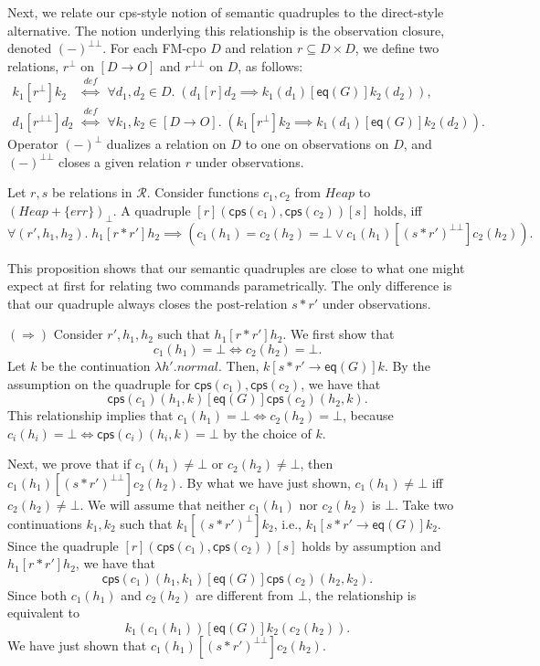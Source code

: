 \documentclass{LMCS}
\newcommand{\Heap}{\mathit{Heap}}
\newcommand{\Obs}{\mathit{O}}
\newcommand{\Good}{\mathit{G}}
\newcommand{\cR}{\mathcal{R}}
\newcommand{\normal}{\mathit{normal}}
\newcommand{\error}{\mathit{err}}
\newcommand{\mperp}{{\bot{\!\!}\bot}}
\newcommand{\squad}[4]{{[{#1}]}
                        ({#2},  {#3})
                       {[{#4}]}}
\newcommand{\EQ}{\mathsf{eq}}
\newcommand{\defliff}{\stackrel{\mathit{def}}{\iff}}
\newcommand{\cps}{\mathsf{cps}}
\begin{document}
Next, we relate our cps-style notion of semantic quadruples 
to the direct-style alternative. The notion underlying 
this relationship is the observation closure, denoted $(-)^\mperp$.
For each FM-cpo $D$ and relation 
$r \subseteq D \times D$, we define two relations, 
$r^\bot$ on $[D \rightarrow \Obs]$ and $r^\mperp$ on $D$,
as follows:
$$
\begin{array}{rcl}
   k_1[r^\bot]k_2 
   & \defliff &
   \forall d_1,d_2 \in D.\;
       (d_1[r]d_2 \implies k_1(d_1)[\EQ(\Good)]k_2(d_2)),
\\
   d_1[r^\mperp]d_2 
   & \defliff &
   \forall k_1,k_2 \in [D \rightarrow \Obs].\;
       (k_1[r^\bot]k_2 \implies k_1(d_1)[\EQ(\Good)]k_2(d_2)). 
\end{array}
$$
Operator $(-)^\bot$ dualizes a relation on $D$ to
one on observations on $D$, and $(-)^\mperp$ closes a given 
relation $r$ under observations. 
\begin{prop}\label{prop:quadruple-direct}
Let $r,s$ be relations in $\cR$.
Consider functions $c_1,c_2$ from 
$\Heap$ to $(\Heap  + \{\error\})_\bot$.
A quadruple $\squad{r}{\cps(c_1)}{\cps(c_2)}{s}$ holds, iff
$$
\forall (r',h_1,h_2).\;
h_1[r*r']h_2 
\implies
(c_1(h_1){=}c_2(h_2){=}\bot \vee c_1(h_1)[(s*r')^\mperp]c_2(h_2)).
$$
\end{prop}
This proposition shows that our semantic quadruples are close
to what one might expect at first for relating two commands
parametrically. The only difference is that our
quadruple always closes the post-relation $s*r'$ under 
observations.

$(\Rightarrow)$
Consider $r',h_1,h_2$ such that $h_1[r*r']h_2$. We
first show that 
$$
  c_1(h_1) = \bot \iff c_2(h_2) = \bot.
$$
 Let $k$ be the continuation $\lambda h'.\normal$.
Then, $k[s*r' \rightarrow \EQ(\Good)]k$. By the assumption
on the quadruple for $\cps(c_1),\cps(c_2)$, we have that
$$
   \cps(c_1)(h_1,k)[\EQ(\Good)]\cps(c_2)(h_2,k).
$$ 
This relationship implies that
$c_1(h_1) = \bot \iff c_2(h_2) = \bot$, because 
$c_i(h_i) = \bot \iff \cps(c_i)(h_i,k) = \bot$ by
the choice of $k$.

Next, we prove that if $c_1(h_1)\not=\bot$ or 
$c_2(h_2)\not=\bot$, then $c_1(h_1)[(s*r')^\mperp]c_2(h_2)$.
By what we have just shown, $c_1(h_1)\not=\bot$ iff
$c_2(h_2)\not=\bot$. We will assume that neither $c_1(h_1)$
nor $c_2(h_2)$ is $\bot$. Take two continuations $k_1,k_2$
such that $k_1[(s*r')^\bot]k_2$, i.e.,
$k_1[s*r' \rightarrow \EQ(\Good)]k_2$. Since the quadruple
$\squad{r}{\cps(c_1)}{\cps(c_2)}{s}$ holds by assumption
and $h_1[r*r']h_2$, we have that 
$$
  \cps(c_1)(h_1,k_1)[\EQ(\Good)]\cps(c_2)(h_2,k_2).
$$
Since both $c_1(h_1)$ and $c_2(h_2)$ are different from $\bot$,
 the relationship is equivalent to
$$
k_1(c_1(h_1))[\EQ(\Good)]k_2(c_2(h_2)).
$$ 
We have just shown
that $c_1(h_1)[(s*r')^\mperp]c_2(h_2)$.
\end{document}
